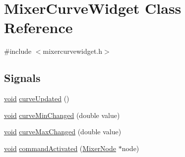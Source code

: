 \hypertarget{class_mixer_curve_widget}{\section{\-Mixer\-Curve\-Widget \-Class \-Reference}
\label{class_mixer_curve_widget}
}


{\ttfamily \#include $<$mixercurvewidget.\-h$>$}

\subsection*{\-Signals}
\begin{DoxyCompactItemize}
\item 
\hyperlink{group___u_a_v_objects_plugin_ga444cf2ff3f0ecbe028adce838d373f5c}{void} \hyperlink{group___u_a_v_object_widget_utils_ga90255ec9acd8db01306ae5f9af229f39}{curve\-Updated} ()
\item 
\hyperlink{group___u_a_v_objects_plugin_ga444cf2ff3f0ecbe028adce838d373f5c}{void} \hyperlink{group___u_a_v_object_widget_utils_gac254f263b61538dfab5f1f2a06a7bb12}{curve\-Min\-Changed} (double value)
\item 
\hyperlink{group___u_a_v_objects_plugin_ga444cf2ff3f0ecbe028adce838d373f5c}{void} \hyperlink{group___u_a_v_object_widget_utils_gabf78aa6aaa393045db87deb6a481c3b1}{curve\-Max\-Changed} (double value)
\item 
\hyperlink{group___u_a_v_objects_plugin_ga444cf2ff3f0ecbe028adce838d373f5c}{void} \hyperlink{group___u_a_v_object_widget_utils_ga967ede8f3f93e35d68361368d7ce8d49}{command\-Activated} (\hyperlink{class_mixer_node}{\-Mixer\-Node} $\ast$node)
\end{DoxyCompactItemize}
